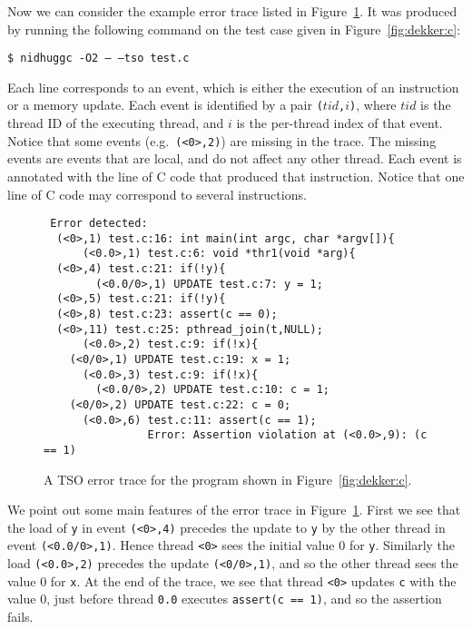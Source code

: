 \documentclass[a4paper]{article}
\begin{document}
Now we can consider the example error trace listed in
Figure~\ref{fig:ex:error:trace:dekker:tso}. It was produced by running the
following command on the test case given in Figure~\ref{fig:dekker:c}:

\vspace{5pt}
\noindent
\texttt{\$ nidhuggc -O2 -- --tso test.c}

\vspace{5pt}\noindent
%
Each line corresponds to an event, which is either the execution of an
instruction or a memory update. Each event is identified by a pair
\texttt{($tid$,$i$)}, where $tid$ is the thread ID of the executing
thread, and $i$ is the per-thread index of that event. Notice that
some events (e.g.\ \texttt{(<0>,2)}) are missing in the trace. The
missing events are events that are local, and do not affect any other
thread. Each event is annotated with the line of C code that produced
that instruction. Notice that one line of C code may correspond to
several instructions.

\begin{figure}
\begin{verbatim}
 Error detected:
  (<0>,1) test.c:16: int main(int argc, char *argv[]){
      (<0.0>,1) test.c:6: void *thr1(void *arg){
  (<0>,4) test.c:21: if(!y){
        (<0.0/0>,1) UPDATE test.c:7: y = 1;
  (<0>,5) test.c:21: if(!y){
  (<0>,8) test.c:23: assert(c == 0);
  (<0>,11) test.c:25: pthread_join(t,NULL);
      (<0.0>,2) test.c:9: if(!x){
    (<0/0>,1) UPDATE test.c:19: x = 1;
      (<0.0>,3) test.c:9: if(!x){
        (<0.0/0>,2) UPDATE test.c:10: c = 1;
    (<0/0>,2) UPDATE test.c:22: c = 0;
      (<0.0>,6) test.c:11: assert(c == 1);
                Error: Assertion violation at (<0.0>,9): (c == 1)
\end{verbatim}
  \caption{A TSO error trace for the program shown in
    Figure~\ref{fig:dekker:c}.}\label{fig:ex:error:trace:dekker:tso}
\end{figure}

We point out some main features of the error trace in
Figure~\ref{fig:ex:error:trace:dekker:tso}.
%
First we see that the load of \texttt{y} in event \texttt{(<0>,4)}
precedes the update to \texttt{y} by the other thread in event
\texttt{(<0.0/0>,1)}. Hence thread \texttt{<0>} sees the initial value
0 for \texttt{y}. Similarly the load \texttt{(<0.0>,2)} precedes the
update \texttt{(<0/0>,1)}, and so the other thread sees the value 0
for \texttt{x}.
%
At the end of the trace, we see that thread \texttt{<0>} updates
\texttt{c} with the value 0, just before thread \texttt{0.0} executes
\texttt{assert(c == 1)}, and so the assertion fails.
\end{document}
